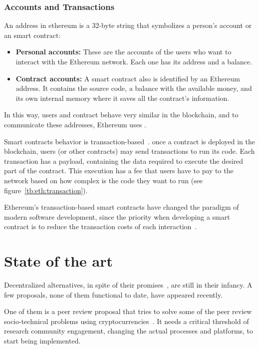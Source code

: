 \subsubsection*{Accounts and Transactions}
\label{ts:at}
An address in ethereum is a 32-byte string that symbolizes a person's account or
an smart contract:
\begin{itemize}
\item \textbf{Personal accounts:} These are the accounts of the users who want
  to interact with the Ethereum network. Each one has its address and a balance.
\item \textbf{Contract accounts:} A smart contract also is identified by an
  Ethereum address. It contains the source code, a balance with the available
  money, and its own internal memory where it saves all the contract's
  information.
\end{itemize}

In this way, users and contract behave very similar in the blockchain, and to
communicate these addresses, Ethereum uses .


Smart contracts behavior is transaction-based~\cite{wood2014ethereum}. once a
contract is deployed in the blockchain, users (or other contracts) may send
transactions to run its code. Each transaction has a payload, containing the
data required to execute the desired part of the contract. This execution has a
fee that users have to pay to the network based on how complex is the code they
want to run (see figure~\ref{tb:eth:transaction}).

Ethereum's transaction-based smart contracts have changed the paradigm of modern
software development, since the priority when developing a smart contract is to
reduce the transaction costs of each interaction~\cite{delmolino2016step}.


\section{State of the art}


Decentralized alternatives, in spite of their
promises~\cite{bartlingblockchain}, are still in their infancy. A few proposals,
none of them functional to date, have appeared recently.

One of them is a peer review proposal that tries to solve some of the peer
review socio-technical problems using cryptocurrencies~\cite{tennant2017multi}.
It needs a critical threshold of research community engagement, changing the
actual processes and platforms, to start being implemented.

